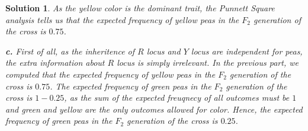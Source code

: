 \documentclass{article} %
\theoremstyle{quest}
\newtheorem*{solution}{Solution}
\begin{document}
\begin{solution}
\pagebreak

As the yellow color is the dominant trait, the Punnett Square analysis tells us that
the expected frequency of yellow peas in the $F_2$ generation of the cross is $0.75$. \\

\smallskip

\textbf{c.}
First of all, as the inheritence of $R$ locus and $Y$ locus are independent for peas, 
the extra information about $R$ locus is simply irrelevant. In the previous part,
we computed that the expected frequency 
of yellow peas in the $F_2$ generation of the cross is $0.75$. The expected
frequency of green peas in the $F_2$ generation of the cross is $1 - 0.25$, 
as the sum of the expected freuqnecy of all outcomes must be $1$ and green and yellow
are the only outcomes allowed for color. Hence,
the expected frequency of green peas in the $F_2$ generation of the cross is $0.25$. \\

\smallskip

\end{solution}

\bigskip
\end{document}
